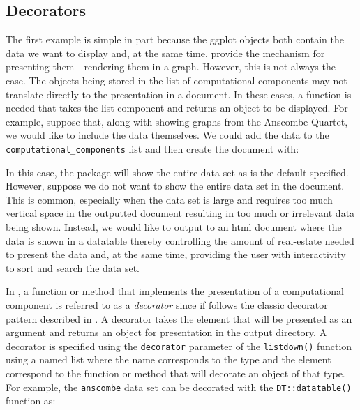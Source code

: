 \hypertarget{decorators}{%
\subsection{Decorators}\label{decorators}}

The first example is simple in part because the ggplot objects both
contain the data we want to display and, at the same time, provide the
mechanism for presenting them - rendering them in a graph. However, this
is not always the case. The objects being stored in the list of
computational components may not translate directly to the presentation
in a document. In these cases, a function is needed that takes the list
component and returns an object to be displayed. For example, suppose
that, along with showing graphs from the Anscombe Quartet, we would like
to include the data themselves. We could add the data to the
\texttt{computational\_components} list and then create the document
with:

\begin{Schunk}
\end{Schunk}

In this case, the  package will show the entire data set
as is the default specified. However, suppose we do not want to show the
entire data set in the document. This is common, especially when the
data set is large and requires too much vertical space in the outputted
document resulting in too much or irrelevant data being shown. Instead,
we would like to output to an html document where the data is shown in a
datatable thereby controlling the amount of real-estate needed to
present the data and, at the same time, providing the user with
interactivity to sort and search the data set.

In , a function or method that implements the presentation
of a computational component is referred to as a \emph{decorator} since
if follows the classic decorator pattern described in \citet{gamma1995}.
A decorator takes the element that will be presented as an argument and
returns an object for presentation in the output directory. A decorator
is specified using the \texttt{decorator} parameter of the
\texttt{listdown()} function using a named list where the name
corresponds to the type and the element correspond to the function or
method that will decorate an object of that type. For example, the
\texttt{anscombe} data set can be decorated with the
\texttt{DT::datatable()} function \citep{xie2020} as:

